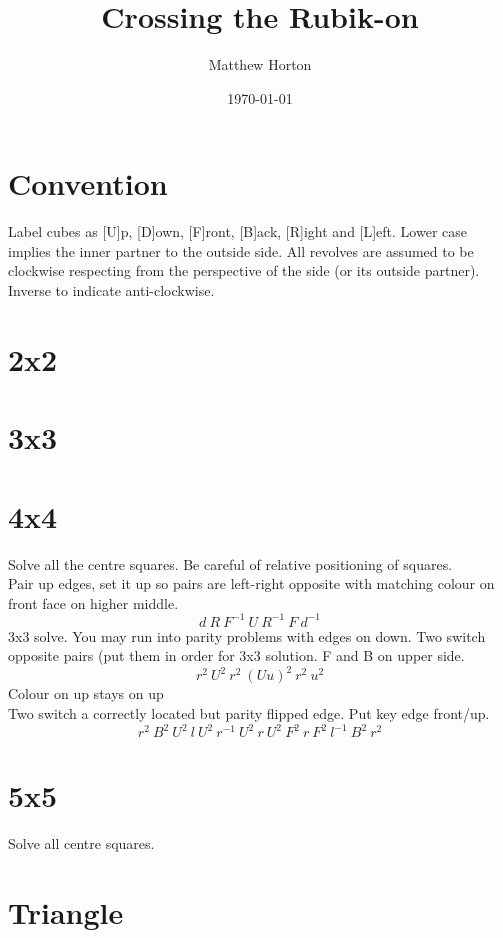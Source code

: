 \documentclass[a4paper]{scrartcl}
\title{Crossing the Rubik-on}
\author{Matthew Horton}
\date{\today}
\begin{document}
\maketitle
\section{Convention}
Label cubes as [U]p, [D]own, [F]ront, [B]ack, [R]ight and [L]eft. Lower case implies the inner partner to the outside side. All revolves are assumed to be clockwise respecting from the perspective of the side (or its outside partner). Inverse to indicate anti-clockwise.

\section{2x2}

\section{3x3}

\section{4x4}
Solve all the centre squares. Be careful of relative positioning of squares.\\
Pair up edges, set it up so pairs are left-right opposite with matching colour on front face on higher middle. 
$$d\ R\ F^{-1}\ U\ R^{-1}\ F\ d^{-1}$$
3x3 solve. You may run into parity problems with edges on down.
Two switch opposite pairs (put them in order for 3x3 solution. F and B on upper side.
$$r^{2}\ U^{2}\ r^{2}\ (Uu)^{2}\ r^{2}\ u^2$$ Colour on up stays on up\\
Two switch a correctly located but parity flipped edge. Put key edge front/up.
$$r^{2}\ B^{2}\ U^{2}\ l\ U^{2}\ r^{-1}\ U^{2}\ r\ U^{2}\ F^{2}\ r\ F^{2}\ l^{-1}\ B^{2}\ r^{2}$$

\section{5x5}
Solve all centre squares.

\section{Triangle}
\end{document}
